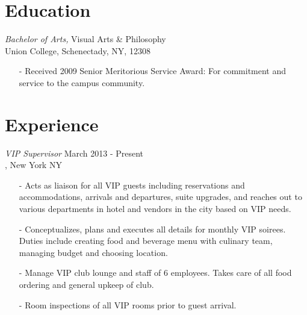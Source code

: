 \documentclass[margin, 10pt]{res} %
\begin{document}
\begin{resume}


\vspace{-20pt}
\section{Education}

{\sl Bachelor of Arts,} Visual Arts \& Philosophy \\
Union College, Schenectady, NY, 12308 \\
\vspace{-10pt}
\begin{itemize} \itemsep -2pt
\item[-] Received 2009 Senior Meritorious Service Award: For commitment and service to the campus community.
\end{itemize}
 
 
\section{Experience}

{\sl VIP Supervisor} \hfill March 2013 - Present \\
\sheraton, New York NY
\begin{itemize} \itemsep -2pt
\item[-] Acts as liaison for all VIP guests including reservations and accommodations, arrivals and departures, suite upgrades, and reaches out to various departments in hotel and vendors in the city based on VIP needs.
\item[-] Conceptualizes, plans and executes all details for monthly VIP soirees. Duties include creating food and beverage menu with culinary team, managing budget and choosing location.
\item[-] Manage VIP club lounge and staff of 6 employees. Takes care of all food ordering and general upkeep of club.
\item[-] Room inspections of all VIP rooms prior to guest arrival.
\end{itemize}


\end{resume}
\end{document}
